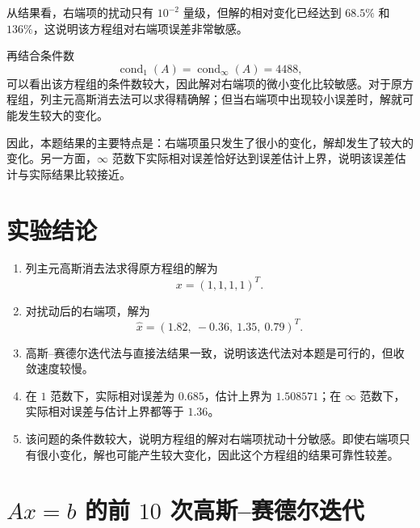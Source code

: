 \documentclass[12pt,a4paper]{ctexart}
\begin{document}
从结果看，右端项的扰动只有 $10^{-2}$ 量级，但解的相对变化已经达到 $68.5\%$ 和 $136\%$，这说明该方程组对右端项误差非常敏感。

再结合条件数
\[
\operatorname{cond}_1(A)=\operatorname{cond}_{\infty}(A)=4488,
\]
可以看出该方程组的条件数较大，因此解对右端项的微小变化比较敏感。对于原方程组，列主元高斯消去法可以求得精确解；但当右端项中出现较小误差时，解就可能发生较大的变化。

因此，本题结果的主要特点是：右端项虽只发生了很小的变化，解却发生了较大的变化。另一方面，$\infty$ 范数下实际相对误差恰好达到误差估计上界，说明该误差估计与实际结果比较接近。

\section{实验结论}

\begin{enumerate}
    \item 列主元高斯消去法求得原方程组的解为
    \[
    x=(1,1,1,1)^T.
    \]
    \item 对扰动后的右端项，解为
    \[
    \hat{x}=(1.82,\ -0.36,\ 1.35,\ 0.79)^T.
    \]
    \item 高斯--赛德尔迭代法与直接法结果一致，说明该迭代法对本题是可行的，但收敛速度较慢。
    \item 在 $1$ 范数下，实际相对误差为 $0.685$，估计上界为 $1.508571$；在 $\infty$ 范数下，实际相对误差与估计上界都等于 $1.36$。
    \item 该问题的条件数较大，说明方程组的解对右端项扰动十分敏感。即使右端项只有很小变化，解也可能产生较大变化，因此这个方程组的结果可靠性较差。
\end{enumerate}

\appendix
\pagestyle{plain}
\markboth{}{}

\section{$Ax=b$ 的前 $10$ 次高斯--赛德尔迭代}
\end{document}
